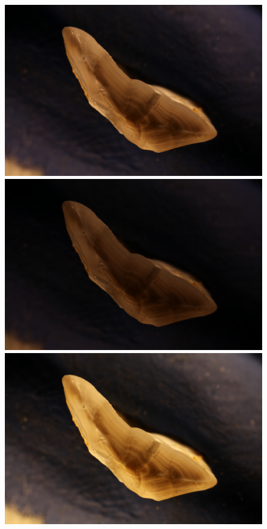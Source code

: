 \documentclass[10pt,letterpaper]{article}
\begin{document}
\begin{figure}[h!]
  \includegraphics[scale=0.015]{otolith/IMG_0460_2016_70021.JPG}
  \includegraphics[scale=0.015]{otolith/IMG_0461_2016_70021.JPG}
  \includegraphics[scale=0.015]{otolith/IMG_0462_2016_70021.JPG}
  
  \label{marker1}
\end{figure}
\end{document}
